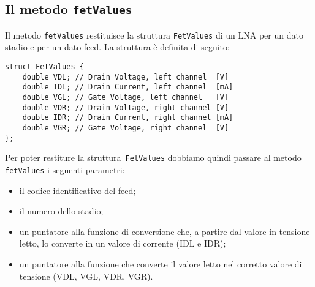 \subsection{Il metodo \texttt{fetValues}}
Il metodo \texttt{fetValues} restituisce la struttura \texttt{FetValues} di un LNA
per un dato stadio e per un dato feed. La struttura \`e definita di seguito:
\lstset{language=C++}
\begin{lstlisting}[mathescape]
struct FetValues {
    double VDL; // Drain Voltage, left channel  [V]
    double IDL; // Drain Current, left channel  [mA]
    double VGL; // Gate Voltage, left channel   [V]
    double VDR; // Drain Voltage, right channel [V]
    double IDR; // Drain Current, right channel [mA]
    double VGR; // Gate Voltage, right channel  [V]
};
\end{lstlisting}
\lstset{numbers=none}
Per poter restiture la struttura~\texttt{FetValues} dobbiamo quindi passare al metodo \texttt{fetValues} i seguenti
parametri: 
\begin{itemize}
\item il codice identificativo del feed;
\item il numero dello stadio;
\item un puntatore alla funzione di conversione che, a partire dal valore
in tensione letto, lo converte in un valore di corrente (IDL e IDR);
\item un puntatore alla funzione 
che converte il valore letto nel corretto valore di tensione (VDL, VGL, VDR, VGR).
\end{itemize}
\lstset{language=C++}
